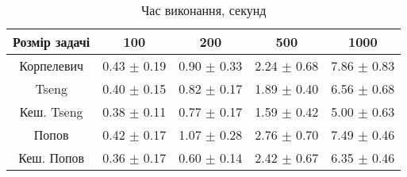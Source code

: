 \begin{table}[H]
	\centering
	\begin{tabular}{|c||c|c|c|c|}\hline
		Розмір задачі & 100 & 200 & 500 & 1000 \\ \hline \hline
		Корпелевич & 0.43 $\pm$ 0.19 & 0.90 $\pm$ 0.33 & 2.24 $\pm$ 0.68 & 7.86 $\pm$ 0.83 \\ \hline
		Tseng & 0.40 $\pm$ 0.15 & 0.82 $\pm$ 0.17 & 1.89 $\pm$ 0.40 & 6.56 $\pm$ 0.68 \\ \hline
		Кеш. Tseng & 0.38 $\pm$ 0.11 & 0.77 $\pm$ 0.17 & 1.59 $\pm$ 0.42 & 5.00 $\pm$ 0.63 \\ \hline
		Попов & 0.42 $\pm$ 0.17 & 1.07 $\pm$ 0.28 & 2.76 $\pm$ 0.70 & 7.49 $\pm$ 0.46 \\ \hline
		Кеш. Попов & 0.36 $\pm$ 0.17 & 0.60 $\pm$ 0.14 & 2.42 $\pm$ 0.67 & 6.35 $\pm$ 0.46 \\ \hline
	\end{tabular}
	\caption{Час виконання, секунд}
\end{table}

